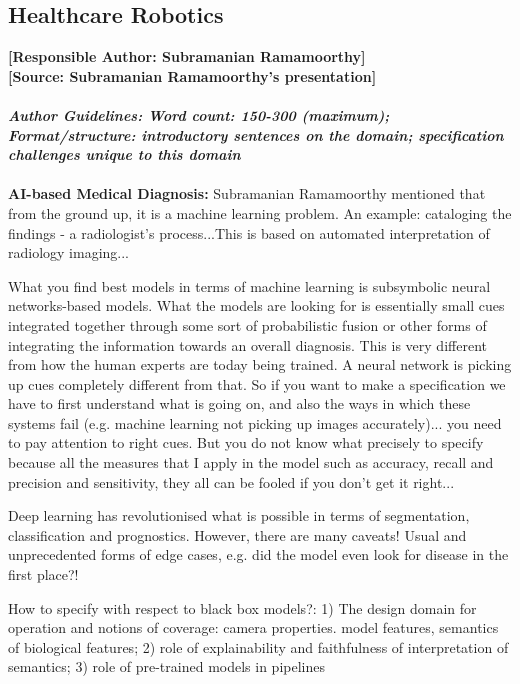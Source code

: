 \documentclass[sigconf]{acmart}
\begin{document}
\subsection{Healthcare Robotics}
\textbf{[Responsible Author:  Subramanian Ramamoorthy]}\\
\noindent\textbf{[Source: Subramanian Ramamoorthy's presentation]}\\\\
\noindent\textbf{\textit{Author Guidelines: Word count: 150-300 (maximum); \\Format/structure: introductory sentences on the domain; specification challenges unique to this domain}}\\\\
\textbf{AI-based Medical Diagnosis:} Subramanian Ramamoorthy mentioned that from the ground up, it is a machine learning problem. 
An example: cataloging the findings - a radiologist's process...This is based on automated interpretation of radiology imaging...
 
What you find best models in terms of machine learning is subsymbolic neural networks-based models. What the models are looking for is essentially small cues integrated together through some sort of  probabilistic fusion or other forms of integrating the information towards an overall diagnosis. This is very different from how the human experts are today being trained. A neural network is picking up cues completely different from that. So if you want to make a specification we have to first understand what is going on, and also the ways in which these systems fail (e.g. machine learning not picking up images accurately)... you need to pay attention to right cues. But you do not know what precisely to specify because all the measures that I apply in the model such as accuracy, recall and precision and sensitivity,  they all can be fooled if you don't get it right...

Deep learning has revolutionised what is possible in terms of segmentation, classification and prognostics. However, there are many caveats!
Usual and unprecedented forms of edge cases, e.g. did the model even look for disease in the first place?!

How to specify with respect to black box models?:
1) The design domain for operation and notions of coverage: camera properties. model features, semantics of biological features; 2) role of explainability and faithfulness of interpretation of semantics; 3) role of pre-trained models in pipelines

\end{document}
